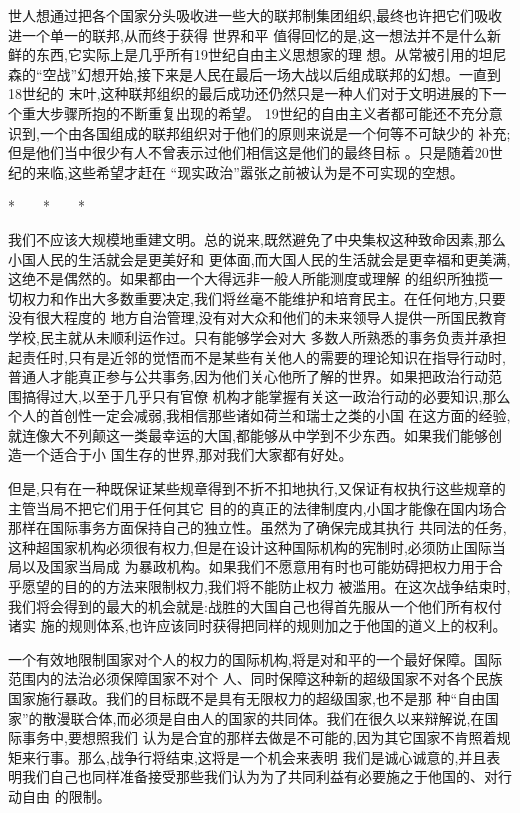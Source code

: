 ﻿\documentclass[12pt]{article}
\begin{document}
世人想通过把各个国家分头吸收进一些大的联邦制集团组织,最终也许把它们吸收进一个单一的联邦,从而终于获得
世界和平 \myrule 值得回忆的是,这一想法并不是什么新鲜的东西,它实际上是几乎所有19世纪自由主义思想家的理
想。从常被引用的坦尼森的``空战''幻想开始,接下来是人民在最后一场大战以后组成联邦的幻想。一直到18世纪的
末叶,这种联邦组织的最后成功还仍然只是一种人们对于文明进展的下一个重大步骤所抱的不断重复出现的希望。
19世纪的自由主义者都可能还不充分意识到,一个由各国组成的联邦组织对于他们的原则来说是一个何等不可缺少的
补充;但是他们当中很少有人不曾表示过他们相信这是他们的最终目标 。只是随着20世纪的来临,这些希望才赶在
``现实政治''嚣张之前被认为是不可实现的空想。

*　　*　　*

我们不应该大规模地重建文明。总的说来,既然避免了中央集权这种致命因素,那么小国人民的生活就会是更美好和
更体面,而大国人民的生活就会是更幸福和更美满,这绝不是偶然的。如果都由一个大得远非一般人所能测度或理解
的组织所独揽一切权力和作出大多数重要决定,我们将丝毫不能维护和培育民主。在任何地方,只要没有很大程度的
地方自治管理,没有对大众和他们的未来领导人提供一所国民教育学校,民主就从未顺利运作过。只有能够学会对大
多数人所熟悉的事务负责并承担起责任时,只有是近邻的觉悟而不是某些有关他人的需要的理论知识在指导行动时,
普通人才能真正参与公共事务,因为他们关心他所了解的世界。如果把政治行动范围搞得过大,以至于几乎只有官僚
机构才能掌握有关这一政治行动的必要知识,那么个人的首创性一定会减弱,我相信那些诸如荷兰和瑞士之类的小国
在这方面的经验,就连像大不列颠这一类最幸运的大国,都能够从中学到不少东西。如果我们能够创造一个适合于小
国生存的世界,那对我们大家都有好处。

但是,只有在一种既保证某些规章得到不折不扣地执行,又保证有权执行这些规章的主管当局不把它们用于任何其它
目的的真正的法律制度内,小国才能像在国内场合那样在国际事务方面保持自己的独立性。虽然为了确保完成其执行
共同法的任务,这种超国家机构必须很有权力,但是在设计这种国际机构的宪制时,必须防止国际当局以及国家当局成
为暴政机构。如果我们不愿意用有时也可能妨碍把权力用于合乎愿望的目的的方法来限制权力,我们将不能防止权力
被滥用。在这次战争结束时,我们将会得到的最大的机会就是:战胜的大国自己也得首先服从一个他们所有权付诸实
施的规则体系,也许应该同时获得把同样的规则加之于他国的道义上的权利。

一个有效地限制国家对个人的权力的国际机构,将是对和平的一个最好保障。国际范围内的法治必须保障国家不对个
人、同时保障这种新的超级国家不对各个民族国家施行暴政。我们的目标既不是具有无限权力的超级国家,也不是那
种``自由国家''的散漫联合体,而必须是自由人的国家的共同体。我们在很久以来辩解说,在国际事务中,要想照我们
认为是合宜的那样去做是不可能的,因为其它国家不肯照着规矩来行事。那么,战争行将结束,这将是一个机会来表明
我们是诚心诚意的,并且表明我们自己也同样准备接受那些我们认为为了共同利益有必要施之于他国的、对行动自由
的限制。
\end{document}
